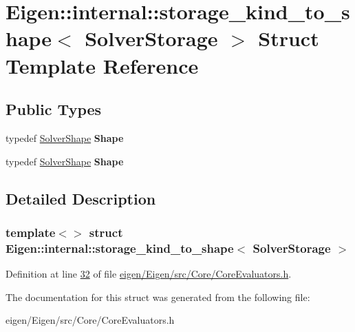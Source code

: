 \hypertarget{struct_eigen_1_1internal_1_1storage__kind__to__shape_3_01_solver_storage_01_4}{}\section{Eigen\+:\+:internal\+:\+:storage\+\_\+kind\+\_\+to\+\_\+shape$<$ Solver\+Storage $>$ Struct Template Reference}
\label{struct_eigen_1_1internal_1_1storage__kind__to__shape_3_01_solver_storage_01_4}
\subsection*{Public Types}
\begin{DoxyCompactItemize}
\item 
\mbox{\label{struct_eigen_1_1internal_1_1storage__kind__to__shape_3_01_solver_storage_01_4_a1b923c49d24934fcdba385e4abb5a619}} 
typedef \hyperlink{struct_eigen_1_1_solver_shape}{Solver\+Shape} {\bfseries Shape}
\item 
\mbox{\label{struct_eigen_1_1internal_1_1storage__kind__to__shape_3_01_solver_storage_01_4_a1b923c49d24934fcdba385e4abb5a619}} 
typedef \hyperlink{struct_eigen_1_1_solver_shape}{Solver\+Shape} {\bfseries Shape}
\end{DoxyCompactItemize}


\subsection{Detailed Description}
\subsubsection*{template$<$$>$\newline
struct Eigen\+::internal\+::storage\+\_\+kind\+\_\+to\+\_\+shape$<$ Solver\+Storage $>$}



Definition at line \hyperlink{eigen_2_eigen_2src_2_core_2_core_evaluators_8h_source_l00032}{32} of file \hyperlink{eigen_2_eigen_2src_2_core_2_core_evaluators_8h_source}{eigen/\+Eigen/src/\+Core/\+Core\+Evaluators.\+h}.



The documentation for this struct was generated from the following file\+:\begin{DoxyCompactItemize}
\item 
eigen/\+Eigen/src/\+Core/\+Core\+Evaluators.\+h\end{DoxyCompactItemize}
